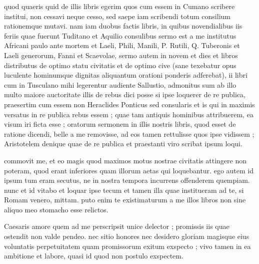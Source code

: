 


 quod quaeris quid de illis libris egerim quos cum essem in Cumano scribere institui, non cessavi neque cesso, sed saepe iam scribendi totum consilium rationemque mutavi. nam iam duobus factis libris, in quibus novendialibus iis feriis quae fuerunt Tuditano et Aquilio consulibus sermo est a me institutus Africani paulo ante mortem et Laeli, Phili, Manili, P. Rutili, Q. Tuberonis et Laeli generorum, Fanni et Scaevolae, sermo autem in novem et dies et libros distributus de optimo statu civitatis et de optimo cive (sane texebatur opus luculente hominumque dignitas aliquantum orationi ponderis adferebat), ii libri cum in Tusculano mihi legerentur audiente Sallustio, admonitus sum ab illo multo maiore auctoritate illis de rebus dici posse si ipse loquerer de re publica, praesertim cum essem non Heraclides Ponticus sed consularis et is qui in maximis versatus in re publica rebus essem ; quae tam antiquis hominibus attribuerem, ea visum iri ficta esse ; oratorum sermonem in illis nostris libris, quod esset de ratione dicendi, belle a me removisse, ad eos tamen rettulisse quos ipse vidissem ; Aristotelem denique quae de re publica et praestanti viro scribat ipsum loqui.

 commovit me, et eo magis quod maximos motus nostrae civitatis attingere non poteram, quod erant inferiores quam illorum aetas qui loquebantur. ego autem id ipsum tum eram secutus, ne in nostra tempora incurrens offenderem quempiam. nunc et id vitabo et loquar ipse tecum et tamen illa quae institueram ad te, si Romam venero, mittam. puto enim te existimaturum a me illos libros non sine aliquo meo stomacho esse relictos.

 Caesaris amore quem ad me perscripsit unice delector ; promissis iis quae ostendit non valde pendeo. nec sitio honores nec desidero gloriam magisque eius voluntatis perpetuitatem quam promissorum exitum exspecto ; vivo tamen in ea ambitione et labore, quasi id quod non postulo exspectem.

